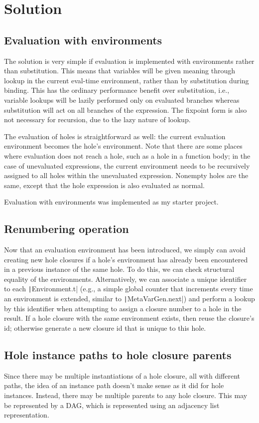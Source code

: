 \documentclass{article}
\begin{document}
\section{Solution}
\subsection{Evaluation with environments}
The solution is very simple if evaluation is implemented with environments rather than substitution. This means that variables will be given meaning through lookup in the current eval-time environment, rather than by substitution during binding. This has the ordinary performance benefit over substitution, i.e., variable lookups will be lazily performed only on evaluated branches whereas substitution will act on all branches of the expression. The fixpoint form is also not necessary for recursion, due to the lazy nature of lookup.

The evaluation of holes is straightforward as well: the current evaluation environment becomes the hole's environment. Note that there are some places where evaluation does not reach a hole, such as a hole in a function body; in the case of unevaluated expressions, the current environment needs to be recursively assigned to all holes within the unevaluated expression. Nonempty holes are the same, except that the hole expression is also evaluated as normal.

Evaluation with environments was implemented as my starter project.

\subsection{Renumbering operation}
Now that an evaluation environment has been introduced, we simply can avoid creating new hole closures if a hole's environment has already been encountered in a previous instance of the same hole. To do this, we can check structural equality of the environments. Alternatively, we can associate a unique identifier to each \texttt|Environment.t| (e.g., a simple global counter that increments every time an environment is extended, similar to \texttt|MetaVarGen.next|) and perform a lookup by this identifier when attempting to assign a closure number to a hole in the result. If a hole closure with the same environment exists, then reuse the closure's id; otherwise generate a new closure id that is unique to this hole.

\subsection{Hole instance paths to hole closure parents}
Since there may be multiple instantiations of a hole closure, all with different paths, the idea of an instance path doesn't make sense as it did for hole instances. Instead, there may be multiple parents to any hole closure. This may be represented by a DAG, which is represented using an adjacency list representation.
\end{document}
